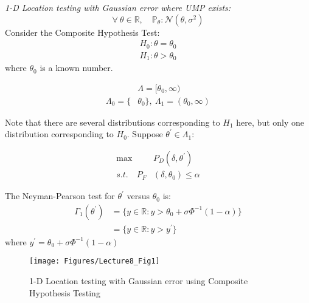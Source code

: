\documentclass[12pt]{report}
\begin{document}
\begin{exmp}
\emph{1-D Location testing with Gaussian error where UMP exists:}\\
\[\forall\ \theta \in \mathbb{R}, \quad \mathbb{P}_\theta : \mathcal{N}(\theta, \sigma^2)\]
\noindent Consider the Composite Hypothesis Test:
\begin{align*}
H_0:\theta = \theta_0 \\
H_1:\theta > \theta_0
\end{align*}
\noindent where $\theta_0$ is a known number.


\begin{align*}
&\Lambda = [\theta_0, \infty)\\
\Lambda_0 = \{&\theta_0\} , \ \Lambda_1 = (\theta_0, \infty)
\end{align*}

\noindent Note that there are several distributions corresponding to $H_1$ here, but only one distribution corresponding to $H_0$. Suppose $\theta^\prime \in \Lambda_1$:

\begin{align*}
\max\ &P_D(\delta, \theta^\prime) \\
s.t. \quad P_F&(\delta, \theta_0) \leq \alpha
\end{align*}

\noindent The Neyman-Pearson test for $\theta^\prime$ versus $\theta_0$ is:
\begin{align}
\Gamma_1(\theta^\prime) &= \{ y \in \mathbb{R} : y > \theta_0 + \sigma\Phi^{-1}(1-\alpha)\} \nonumber\\
&= \{ y \in \mathbb{R} : y > y^\prime \} 
\end{align}
where $y^\prime = \theta_0 + \sigma\Phi^{-1}(1-\alpha)$\\

\begin{figure}[h]
\centering
\texttt{[image: Figures/Lecture8\_Fig1]}
\caption{1-D Location testing with Gaussian error using Composite Hypothesis Testing }
\label{1-DLocationtestCHT}
\end{figure}





\end{exmp}
\end{document}
